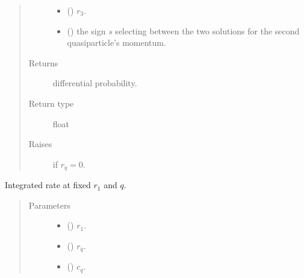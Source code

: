 \documentclass[letterpaper,10pt,english]{sphinxmanual}
\begin{document}
\begin{fulllineitems}
\begin{fulllineitems}
\begin{quote}
\begin{description}
\begin{itemize}
\item {} 
 () \textendash{} \(r_3\).

\item {} 
 () \textendash{} the sign \(s\) selecting between the two solutions
for the second quasiparticle’s momentum.

\end{itemize}

\item[{Returns}] \leavevmode
differential probability.

\item[{Return type}] \leavevmode
float

\item[{Raises}] \leavevmode
{} \textendash{} if \(r_q = 0\).

\end{description}\end{quote}

\end{fulllineitems}


\begin{fulllineitems}
\label{\detokenize{code_structure:scdc.initial.distribution.integral.RateIntegrator.q_rate}}
Integrated rate at fixed \(r_1\) and \(q\).
\begin{quote}\begin{description}
\item[{Parameters}] \leavevmode\begin{itemize}
\item {} 
 () \textendash{} \(r_1\).

\item {} 
 () \textendash{} \(r_q\).

\item {} 
 () \textendash{} \(c_q\).


\end{itemize}
\end{description}
\end{quote}
\end{fulllineitems}
\end{fulllineitems}
\end{document}
